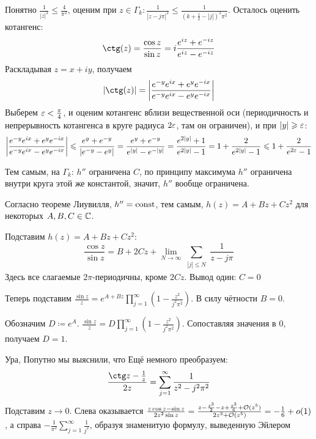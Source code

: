 \documentclass[a4paper]{report}
\begin{document}
{{{            Понятно $\frac{1}{|z|^2} \le \frac{4}{\pi^2}$, оценим при $z \in \Gamma_k: \frac{1}{|z - j\pi|^2} \le \frac{1}{(k + \frac{1}{2} - |j|)^2\pi^2}$.
            Осталось оценить котангенс:
            \[\ctg(z) = \frac{\cos z}{\sin z} = i \frac{e^{iz} + e^{-iz}}{e^{iz} - e^{-iz}}\]
        Раскладывая $z = x + iy$, получаем
            \[|\ctg(z)| = \abs{\frac{e^{-y}e^{ix} + e^y e^{-ix}}{e^{-y}e^{ix} - e^y e^{-ix}}}\]
            Выберем $\varepsilon < \frac{\pi}{4}$, и оценим котангенс вблизи вещественной оси (периодичность и непрерывность котангенса в круге радиуса $2\varepsilon$, там он ограничен), и при $|y| \geqslant \varepsilon$:
            \[\left|\frac{e^{-y}e^{ix} + e^y e^{-ix}}{e^{-y}e^{ix} - e^y e^{-ix}}\right| \leqslant \frac{e^y + e^{-y}}{|e^{-y} - e^y|} = \frac{e^y + e^{-y}}{e^{|y|} - e^{-|y|}} = \frac{e^{2|y|} + 1}{e^{2|y|} - 1} = 1 + \frac{2}{e^{2|y|} - 1} \leqslant 1 + \frac{2}{e^{2\varepsilon} - 1}\]
        \item Тем самым, на $\Gamma_k$: $h''$ ограничена $C$, по принципу максимума $h''$ ограничена внутри круга этой же константой, значит, $h''$ вообще ограничена.

            Согласно теореме Лиувилля, $h'' = \operatorname{const}$, тем самым, $h(z) = A + Bz + C z^2$ для некоторых $A,B,C \in \mathbb{C}$.
        \item Подставим $h(z) =  A + Bz + C z^2$:
        \[\frac{\cos z}{\sin z} = B + 2Cz + \lim\limits_{N \to \infty}\sum\limits_{\substack{|j| \le N}}\frac{1}{z - j\pi}\]
        Здесь все слагаемые $2\pi$-периодичны, кроме $2 C z$. Вывод один: $C = 0$
        \item Теперь подставим $\frac{\sin z}{z} = e^{A + Bz}\prod\limits_{j = 1}^{\infty}\left(1 - \frac{z^2}{j^2\pi^2}\right)$.
            В силу чётности $B = 0$.
        \item   Обозначим $D \coloneqq e^A$. $\frac{\sin z}{z} = D\prod\limits_{j = 1}^{\infty}\left(1 - \frac{z^2}{j^2\pi^2}\right)$.
        Сопоставляя значения в $0$, получаем $D = 1$.
        }
    }
    }
    Ура,
    Попутно мы выяснили, что 
    Ещё немного преобразуем:
    \[\frac{\ctg z - \frac{1}{z}}{2 z} = \sum\limits_{j = 1}^{\infty}\frac{1}{z^2 - j^2\pi^2}\]
    Подставим $z \to 0$.
    Слева оказывается $\frac{z \cos z - \sin z}{2 z^2 \sin z} = \frac{z - \frac{z^3}{2} - z + \frac{z^3}{6} + \mathcal{O}(z^5)}{2z^3 + \mathcal{O}(z^5)} = -\frac{1}{6} + o(1)$, а справа $-\frac{1}{\pi^2}\sum\limits_{j = 1}^{\infty}\frac{1}{j^2}$, образуя знаменитую формулу, выведенную Эйлером
\end{document}
